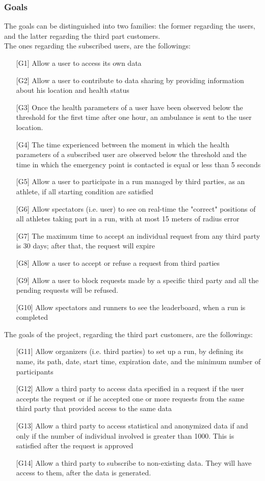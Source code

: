 \subsubsection{Goals}
The goals can be distinguished into two families: the former regarding the users, and the latter regarding the third part customers.\\
The ones regarding the subscribed users, are the followings:
\begin{enumerate}
\item[{[G1]}] Allow a user to access its own data
\item[{[G2]}] Allow a user to contribute to data sharing by providing information about his location and health status
\item[{[G3]}] Once the health parameters of a user have been observed 
below the threshold for the first time after one hour, an ambulance is sent to the user location. 
\item[{[G4]}] The time experienced between the moment in which the health parameters of a subscribed user are observed below the threshold and the time in which the emergency point is contacted is equal or less than 5 seconds
\item[{[G5]}] Allow a user to participate in a run managed by third parties, as an athlete, if all starting condition are satisfied
\item[{[G6]}] Allow spectators (i.e. user) to see on real-time the "correct" positions of all athletes taking part in a run, with at most 15 meters of radius error
\item[{[G7]}] The maximum time to accept an individual request from any third party is 30 days; after that, the request will expire
\item[{[G8]}] Allow a user to accept or refuse a request from third parties
\item[{[G9]}] Allow a user to block requests made by a specific third party and all the pending requests will be refused.
\item[{[G10]}] Allow spectators and runners to see the leaderboard, when a run is completed
\end{enumerate}
The goals of the project, regarding the third part customers, are the followings:
\begin{enumerate}
\item[{[G11]}] Allow organizers (i.e. third parties) to set up a run, by defining its name, its path, date, start time, expiration date, and the minimum number of participants
\item[{[G12]}] Allow a third party to access data specified in a request if the user accepts the request or if he accepted one or more requests from the same third party that provided access to the same data 
\item[{[G13]}] Allow a third party to access statistical and anonymized data if and only if the number of individual involved is greater than 1000. This is satisfied after the request is approved 
\item[{[G14]}] Allow a third party to subscribe to non-existing data. They will have access to them, after the data is generated. 
\end{enumerate}